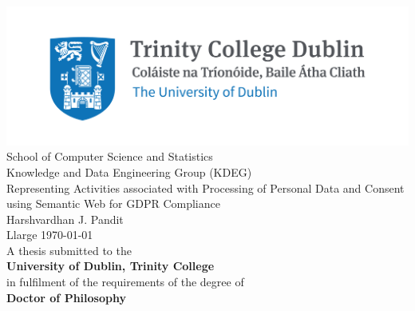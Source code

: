 \pagestyle{empty}
\begin{center}
\includegraphics{img/TCD_logo.png}\\[1cm] 
\Large School of Computer Science and Statistics \\
\large Knowledge and Data Engineering Group (KDEG) \\[1.5cm]

\huge Representing Activities associated with Processing of Personal Data and Consent using Semantic Web for GDPR Compliance \\[1.5cm]
 
\Large Harshvardhan J. Pandit \\[2cm]

{Llarge \today}\\[2cm] %

\normalsize
A thesis submitted to the \\
\textbf{University of Dublin, Trinity College} \\
in fulfilment of the requirements of the degree of \\
\textbf{Doctor of Philosophy}

\normalsize

\vfill %
\end{center}
\restoregeometry